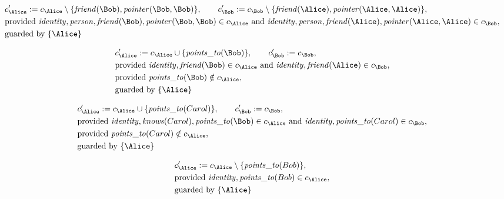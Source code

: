 \begin{align*}
&
c'_
{
\Alice
}
 := 
c_
{
\Alice
}
 \setminus 
\{
\mathit{\detokenize{
friend
}}
(
\Bob
)
,
\mathit{\detokenize{
pointer
}}
(
\Bob
,
\Bob
)
\}
, \qquad 
c'_
{
\Bob
}
 := 
c_
{
\Bob
}
 \setminus 
\{
\mathit{\detokenize{
friend
}}
(
\Alice
)
,
\mathit{\detokenize{
pointer
}}
(
\Alice
,
\Alice
)
\}
,\\
&
\text{provided } 
\mathit{\detokenize{
identity
}}
,
\mathit{\detokenize{
person
}}
,
\mathit{\detokenize{
friend
}}
(
\Bob
)
,
\mathit{\detokenize{
pointer
}}
(
\Bob
,
\Bob
)
 \in c_
{
\Alice
}
 \text{ and } 
\mathit{\detokenize{
identity
}}
,
\mathit{\detokenize{
person
}}
,
\mathit{\detokenize{
friend
}}
(
\Alice
)
,
\mathit{\detokenize{
pointer
}}
(
\Alice
,
\Alice
)
 \in c_
{
\Bob
}
,\\
&
\text{guarded by } \{
\Alice
\}
\end{align*}

\begin{align*}
&
c'_
{
\Alice
}
 := 
c_
{
\Alice
}
 \cup 
\{
\mathit{\detokenize{
points_to
}}
(
\Bob
)
\}
, \qquad 
c'_
{
\Bob
}
 := 
c_
{
\Bob
}
,\\
&
\text{provided } 
\mathit{\detokenize{
identity
}}
,
\mathit{\detokenize{
friend
}}
(
\Bob
)
 \in c_
{
\Alice
}
 \text{ and } 
\mathit{\detokenize{
identity
}}
,
\mathit{\detokenize{
friend
}}
(
\Alice
)
 \in c_
{
\Bob
}
,\\
&
\text{provided } 
\mathit{\detokenize{
points_to
}}
(
\Bob
)
 \notin c_
{
\Alice
}
,\\
&
\text{guarded by } \{
\Alice
\}
\end{align*}

\begin{align*}
&
c'_
{
\Alice
}
 := 
c_
{
\Alice
}
 \cup 
\{
\mathit{\detokenize{
points_to
}}
(
Carol
)
\}
, \qquad 
c'_
{
\Bob
}
 := 
c_
{
\Bob
}
,\\
&
\text{provided } 
\mathit{\detokenize{
identity
}}
,
\mathit{\detokenize{
knows
}}
(
Carol
)
,
\mathit{\detokenize{
points_to
}}
(
\Bob
)
 \in c_
{
\Alice
}
 \text{ and } 
\mathit{\detokenize{
identity
}}
,
\mathit{\detokenize{
points_to
}}
(
Carol
)
 \in c_
{
\Bob
}
,\\
&
\text{provided } 
\mathit{\detokenize{
points_to
}}
(
Carol
)
 \notin c_
{
\Alice
}
,\\
&
\text{guarded by } \{
\Alice
\}
\end{align*}

\begin{align*}
&
c'_
{
\Alice
}
 := 
c_
{
\Alice
}
 \setminus 
\{
\mathit{\detokenize{
points_to
}}
(
Bob
)
\}
,\\
&
\text{provided } 
\mathit{\detokenize{
identity
}}
,
\mathit{\detokenize{
points_to
}}
(
Bob
)
 \in c_
{
\Alice
}
,\\
&
\text{guarded by } \{
\Alice
\}
\end{align*}
